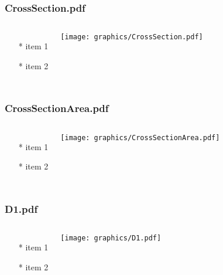 \documentclass{beamer}
\begin{document}
\begin{frame} \frametitle{CrossSection.pdf}
    \begin{columns}[c]
        \begin{itemize}
            \item[*] item 1
            \item[*] item 2
        \end{itemize}
        \begin{minipage}{\linewidth}
            \begin{center}
            \texttt{[image: graphics/CrossSection.pdf]}
            \label{gfx:CrossSection.pdf}
            \end{center}
        \end{minipage}
    \end{columns}
\end{frame}
\begin{frame} \frametitle{CrossSectionArea.pdf}
    \begin{columns}[c]
        \begin{itemize}
            \item[*] item 1
            \item[*] item 2
        \end{itemize}
        \begin{minipage}{\linewidth}
            \begin{center}
            \texttt{[image: graphics/CrossSectionArea.pdf]}
            \label{gfx:CrossSectionArea.pdf}
            \end{center}
        \end{minipage}
    \end{columns}
\end{frame}
\begin{frame} \frametitle{D1.pdf}
    \begin{columns}[c]
        \begin{itemize}
            \item[*] item 1
            \item[*] item 2
        \end{itemize}
        \begin{minipage}{\linewidth}
            \begin{center}
            \texttt{[image: graphics/D1.pdf]}
            \label{gfx:D1.pdf}
            \end{center}
        \end{minipage}
    \end{columns}
\end{frame}
\end{document}

